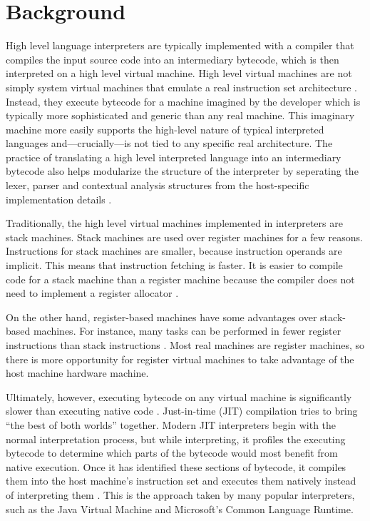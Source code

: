 	\section{Background}
		High level language interpreters are typically implemented with a compiler that compiles the input source code into an intermediary bytecode, which is then interpreted on a high level virtual machine. High level virtual machines are not simply system virtual machines that emulate a real instruction set architecture \citep{smithvmarticle}. Instead, they execute bytecode for a machine imagined by the developer which is typically more sophisticated and generic than any real machine. This imaginary machine more easily supports the high-level nature of typical interpreted languages and---crucially---is not tied to any specific real architecture. The practice of translating a high level interpreted language into an intermediary bytecode also helps modularize the structure of the interpreter by seperating the lexer, parser and contextual analysis structures from the host-specific implementation details \citep{structureinterpreters}.
	
		Traditionally, the high level virtual machines implemented in interpreters are stack machines. Stack machines are used over register machines for a few reasons. Instructions for stack machines are smaller, because instruction operands are implicit. This means that instruction fetching is faster. It is easier to compile code for a stack machine than a register machine because the compiler does not need to implement a register allocator \citep{caseregistervm}.
	
		On the other hand, register-based machines have some advantages over stack-based machines. For instance, many tasks can be performed in fewer register instructions than stack instructions \citep{caseregistervm}. Most real machines are register machines, so there is more opportunity for register virtual machines to take advantage of the host machine hardware machine. 
		
		Ultimately, however, executing bytecode on any virtual machine is significantly slower than executing native code \citep{optimizingindirectbranch}. Just-in-time (JIT) compilation tries to bring ``the best of both worlds'' together. Modern JIT interpreters begin with the normal interpretation process, but while interpreting, it profiles the executing bytecode to determine which parts of the bytecode would most benefit from native execution. Once it has identified these sections of bytecode, it compiles them into the host machine's instruction set and executes them natively instead of interpreting them \citep{historyjit}. This is the approach taken by many popular interpreters, such as the Java Virtual Machine and Microsoft's Common Language Runtime.
		
